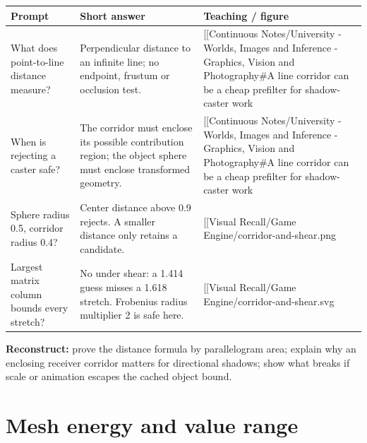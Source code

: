 {\def\LTcaptype{none} %
\begin{longtable}[]{@{}
  >{\raggedright\arraybackslash}p{}
  >{\raggedright\arraybackslash}p{}
  >{\raggedright\arraybackslash}p{}@{}}
\toprule\noalign{}
\begin{minipage}[b]{\linewidth}\raggedright
Prompt
\end{minipage} & \begin{minipage}[b]{\linewidth}\raggedright
Short answer
\end{minipage} & \begin{minipage}[b]{\linewidth}\raggedright
Teaching / figure
\end{minipage} \\
\midrule\noalign{}
\endhead
\bottomrule\noalign{}
\endlastfoot
What does point-to-line distance measure? & Perpendicular distance to an infinite line; no endpoint, frustum or occlusion test. & {[}{[}Continuous Notes/University - Worlds, Images and Inference - Graphics, Vision and Photography\#A line corridor can be a cheap prefilter for shadow-caster work \\
When is rejecting a caster safe? & The corridor must enclose its possible contribution region; the object sphere must enclose transformed geometry. & {[}{[}Continuous Notes/University - Worlds, Images and Inference - Graphics, Vision and Photography\#A line corridor can be a cheap prefilter for shadow-caster work \\
Sphere radius 0.5, corridor radius 0.4? & Center distance above 0.9 rejects. A smaller distance only retains a candidate. & {[}{[}Visual Recall/Game Engine/corridor-and-shear.png \\
Largest matrix column bounds every stretch? & No under shear: a 1.414 guess misses a 1.618 stretch. Frobenius radius multiplier 2 is safe here. & {[}{[}Visual Recall/Game Engine/corridor-and-shear.svg \\
\end{longtable}
}

\textbf{Reconstruct:} prove the distance formula by parallelogram area; explain why an enclosing receiver corridor matters for directional shadows; show what breaks if scale or animation escapes the cached object bound.

\section{Mesh energy and value range}\label{appendix-a8f634b076b5-mesh-energy-and-value-range}

